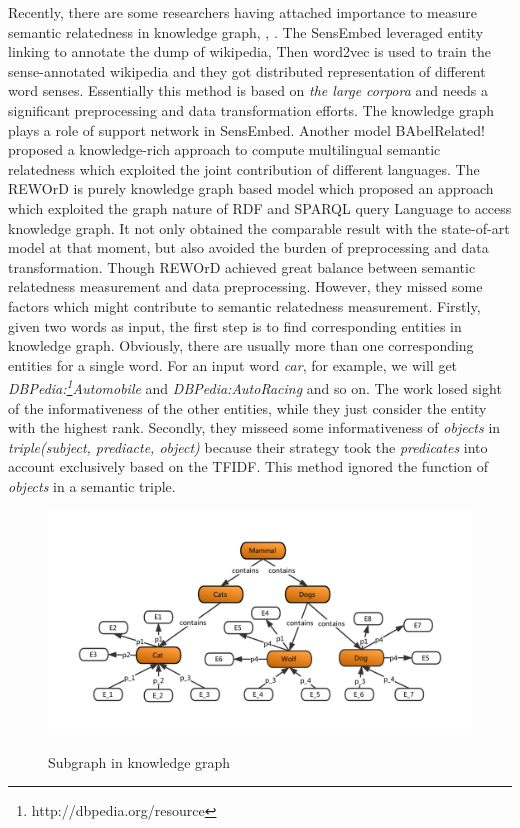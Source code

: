 Recently, there are some researchers having attached importance to measure semantic relatedness
in knowledge graph\cite{acl/IacobacciPN15}, \cite{aaai/NavigliP12}, \cite{aaai/Pirro12}. 
The SensEmbed \cite{acl/IacobacciPN15} leveraged entity linking to annotate the dump of wikipedia,
Then word2vec\cite{corr/Mikolov13} is used to train the sense-annotated wikipedia and they got distributed representation of different 
word senses. Essentially this method is based on \emph{the large corpora} and needs a significant preprocessing
and data transformation efforts. The knowledge graph plays a role of support network in SensEmbed.
Another model BAbelRelated!\cite{aaai/NavigliP12} proposed a knowledge-rich approach to compute multilingual semantic
relatedness which exploited the joint contribution of different languages. 
The REWOrD \cite{aaai/Pirro12} is purely knowledge graph based model which proposed an approach which exploited 
the graph nature of RDF and SPARQL query Language to access knowledge graph. It not only obtained the comparable
result with the state-of-art model at that moment, but also avoided the burden
of preprocessing and data transformation. Though REWOrD\cite{aaai/Pirro12} achieved great balance between
semantic relatedness measurement and data preprocessing.
However, they missed some factors which might contribute to semantic relatedness measurement. 
Firstly, given two words as input, the first step is to find corresponding entities in knowledge
graph. Obviously, there are usually more than one corresponding entities for a single word.
For an input word \emph{car}, for example, we will get \emph{DBPedia:\footnote{http://dbpedia.org/resource}Automobile} and
\emph{DBPedia:Auto\underline{\hspace{0.5em}}Racing} and so on. The work \cite{aaai/Pirro12} losed
sight of the informativeness of the other entities, while they just
consider the entity with the highest rank. Secondly, they \cite{aaai/Pirro12} misseed
some informativeness of \emph{objects} in \emph{triple(subject, prediacte, object)} because their strategy took
the \emph{predicates} into account exclusively based on the TFIDF. This
method ignored the function of \emph{objects} in a semantic triple.

\begin{figure}
    \flushleft
    \includegraphics[width=1.1\textwidth]{pic/introduction.pdf}\\
    \caption{Subgraph in knowledge graph}
    \label{weak1}
\end{figure}

